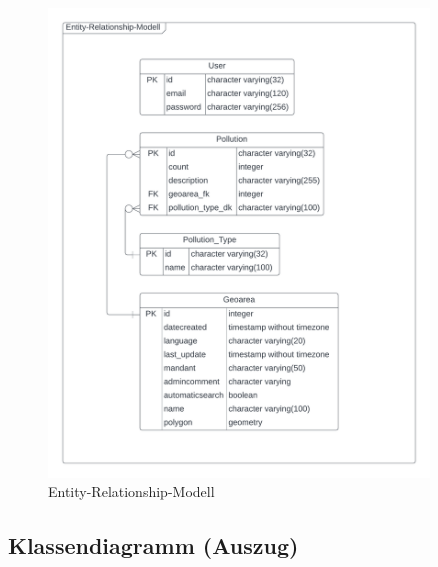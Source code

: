 \documentclass[a4paper,12pt]{article}
\begin{document}
\begin{figure}[h]
\centering
\includegraphics[width=0.9\textwidth]{bilder/Entity-Relationship-Diagram4.png}
\caption{Entity-Relationship-Modell}
\end{figure}

\clearpage
\subsection{Klassendiagramm (Auszug)}
\label{sec:klassendiagramm}
\end{document}

